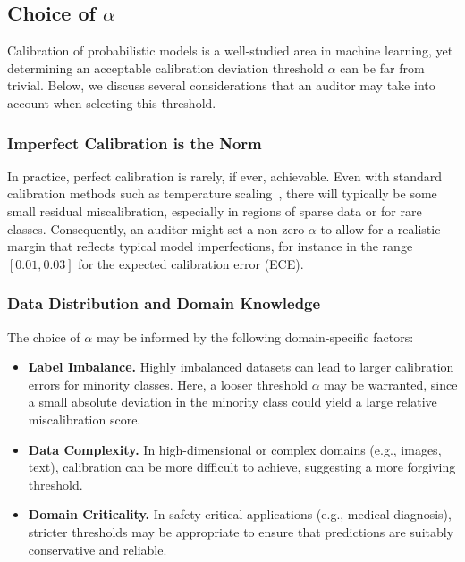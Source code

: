 \subsection{Choice of $\alpha$}
\label{app:alpha_choice}

Calibration of probabilistic models is a well-studied area in machine learning, yet determining an acceptable calibration deviation threshold $\alpha$ can be far from trivial. Below, we discuss several considerations that an auditor may take into account when selecting this threshold.

\subsubsection{Imperfect Calibration is the Norm}

In practice, perfect calibration is rarely, if ever, achievable. Even with standard calibration methods such as temperature scaling~\cite{guo2017calibration}, there will typically be some small residual miscalibration, especially in regions of sparse data or for rare classes. Consequently, an auditor might set a non-zero $\alpha$ to allow for a realistic margin that reflects typical model imperfections, for instance in the range $[0.01, 0.03]$ for the expected calibration error (ECE).

\subsubsection{Data Distribution and Domain Knowledge}

The choice of $\alpha$ may be informed by the following domain-specific factors:
\begin{itemize}
    \item \textbf{Label Imbalance.} Highly imbalanced datasets can lead to larger calibration errors for minority classes. Here, a looser threshold $\alpha$ may be warranted, since a small absolute deviation in the minority class could yield a large relative miscalibration score.
    \item \textbf{Data Complexity.} In high-dimensional or complex domains (e.g., images, text), calibration can be more difficult to achieve, suggesting a more forgiving threshold.
    \item \textbf{Domain Criticality.} In safety-critical applications (e.g., medical diagnosis), stricter thresholds may be appropriate to ensure that predictions are suitably conservative and reliable.
\end{itemize}

